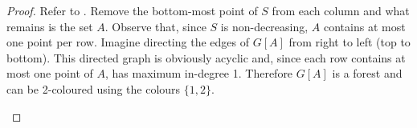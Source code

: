 \documentclass{patmorin}
\begin{document}
\begin{proof}
   Refer to .  Remove the bottom-most point of
   $S$ from each column and what remains is the set $A$.  Observe that,
   since $S$ is non-decreasing, $A$ contains at most one point per row.
   Imagine directing the edges of $G[A]$ from right to left (top to
   bottom).  This directed graph is obviously acyclic and, since each row contains at most one point of $A$, has maximum in-degree 1.  Therefore $G[A]$
   is a forest and can be 2-coloured using the colours $\{1,2\}$. 
   \begin{figure}
\end{figure}
\end{proof}
\end{document}
